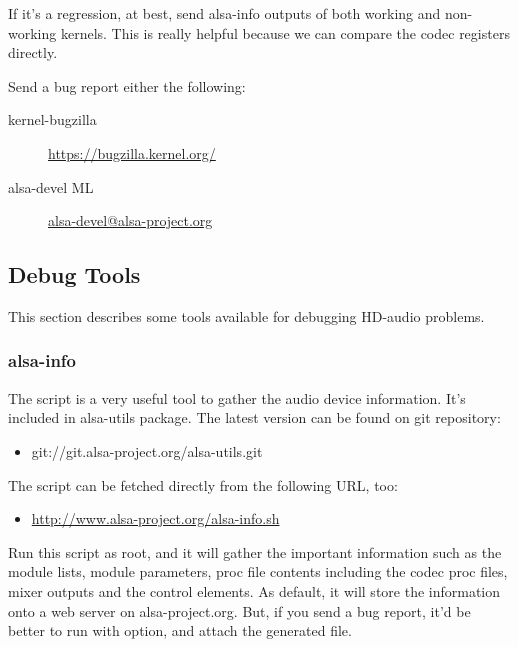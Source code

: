 \documentclass[a4paper,8pt,english]{sphinxmanual}
\begin{document}
If it's a regression, at best, send alsa-info outputs of both working
and non-working kernels.  This is really helpful because we can
compare the codec registers directly.

Send a bug report either the following:
\begin{description}
\item[{kernel-bugzilla}] \leavevmode
\href{https://bugzilla.kernel.org/}{https://bugzilla.kernel.org/}

\item[{alsa-devel ML}] \leavevmode
\href{mailto:alsa-devel@alsa-project.org}{alsa-devel@alsa-project.org}

\end{description}


\subsection{Debug Tools}
\label{sound/hd-audio/notes:debug-tools}
This section describes some tools available for debugging HD-audio
problems.


\subsubsection{alsa-info}
\label{sound/hd-audio/notes:alsa-info}
The script  is a very useful tool to gather the audio
device information.  It's included in alsa-utils package.  The latest
version can be found on git repository:
\begin{itemize}
\item {} 
git://git.alsa-project.org/alsa-utils.git

\end{itemize}

The script can be fetched directly from the following URL, too:
\begin{itemize}
\item {} 
\href{http://www.alsa-project.org/alsa-info.sh}{http://www.alsa-project.org/alsa-info.sh}

\end{itemize}

Run this script as root, and it will gather the important information
such as the module lists, module parameters, proc file contents
including the codec proc files, mixer outputs and the control
elements.  As default, it will store the information onto a web server
on alsa-project.org.  But, if you send a bug report, it'd be better to
run with  option, and attach the generated file.
\end{document}
